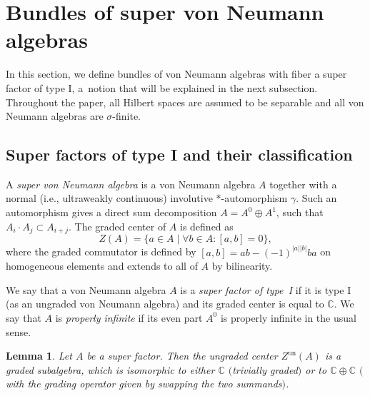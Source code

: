 \documentclass[pdftex]{sigma}
\numberwithin{equation}{section}
\newtheorem{Lemma}[Theorem]{Lemma}
\newcommand{\C}{\mathbb{C}}
\begin{document}
\section{Bundles of super von Neumann algebras}

In this section, we define bundles of von Neumann algebras with fiber a super factor of type I, a~notion that will be explained in the next subsection.
Throughout the paper, all Hilbert spaces are assumed to be separable and all von Neumann algebras are $\sigma$-finite.

\subsection{Super factors of type I and their classification} \label{SectionSuperFactors}

A \emph{super von Neumann algebra} is a von Neumann algebra $A$ together with a normal (i.e., ultraweakly continuous) involutive $*$-automorphism $\gamma$.
Such an automorphism gives a direct sum decomposition $A = A^0 \oplus A^1$, such that $A_i \cdot A_j \subset A_{i+j}$.
The graded center of $A$ is defined as
\begin{equation*}
Z(A) = \{a \in A \mid \forall b \in A\colon  [a, b] = 0 \},
\end{equation*}
where the graded commutator is defined by $[a, b] = ab - (-1)^{|a||b|} ba$ on homogeneous elements and extends to all of $A$ by bilinearity.

\begin{Definition}
We say that a von Neumann algebra $A$ is a \emph{super factor of type~I} if it is type I (as an ungraded von Neumann algebra) and its graded center is equal to $\C$.
We say that $A$ is \emph{properly infinite} if its even part $A^0$ is properly infinite in the usual sense.
\end{Definition}


\begin{Lemma}
\label{LemmaCenterOfSuperFactor}
 Let $A$ be a super factor.
 Then the ungraded center $Z^{\mathrm{un}}(A)$ is a graded subalgebra, which is isomorphic to either $\C$ $($trivially graded$)$ or to $\C \oplus \C$ $($with the grading operator given by swapping the two summands$)$.
\end{Lemma}
\end{document}
